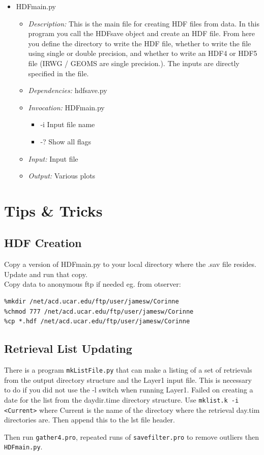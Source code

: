 \documentclass[12pt, letterpaper]{article}
\begin{document}
\begin{itemize}
\item HDFmain.py
\begin{itemize}
\item \textit{Description:} This is the main file for creating HDF files from data. In this program you call the HDFsave object and create an HDF file. From here you define the directory to write the HDF file, whether to write the file using single or double precision, and whether to write an HDF4 or HDF5 file (IRWG / GEOMS are single precision.). The inputs are directly specified in the file.
\item \textit{Dependencies:} hdfsave.py
\item \textit{Invocation:} HDFmain.py
\begin{itemize}
\item -i Input file name
\item -? Show all flags
\end{itemize}
\item \textit{Input:} Input file
\item \textit{Output:} Various plots
\end{itemize}
\end{itemize}


\section{Tips \& Tricks }

\subsection{HDF Creation}

Copy a version of HDFmain.py to your local directory where the .sav file resides.  Update and run that copy. \\

Copy data to anonymous ftp if needed eg. from otserver: 
\begin{verbatim}
%mkdir /net/acd.ucar.edu/ftp/user/jamesw/Corinne
%chmod 777 /net/acd.ucar.edu/ftp/user/jamesw/Corinne
%cp *.hdf /net/acd.ucar.edu/ftp/user/jamesw/Corinne
\end{verbatim}

\subsection{Retrieval List Updating}

There is a program \texttt{mkListFile.py} that can make a listing of a set of retrievals from the output directory structure and the Layer1 input file.  This is necessary to do if you did not use the -l switch when running Layer1.  Failed on creating a date for the list from the daydir.time directory structure.  Use \texttt{mklist.k -i <Current>} where Current is the name of the directory where the retrieval day.tim directories are.  Then append this to the lst file header.

Then run \texttt{gather4.pro}, repeated runs of \texttt{savefilter.pro} to remove outliers then \texttt{HDFmain.py}.
\end{document}
